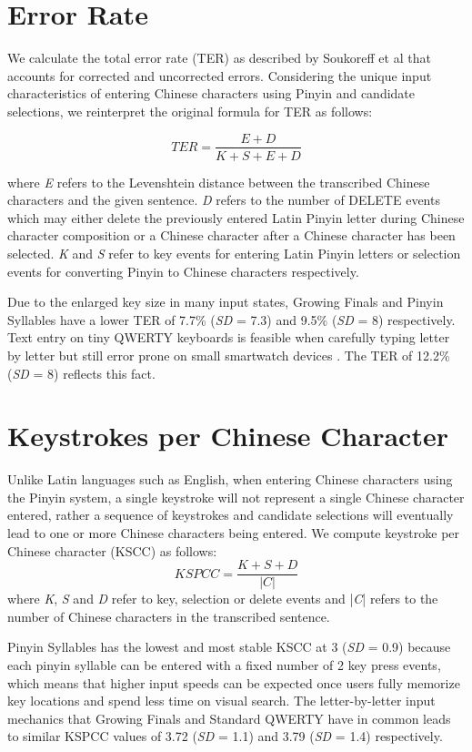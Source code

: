 \section{Error Rate}
We calculate the total error rate (TER) as described by Soukoreff et al \cite{Soukoreff:2003:MTE:642611.642632} that accounts for corrected and uncorrected errors. Considering the unique input characteristics of entering Chinese characters using Pinyin and candidate selections, we reinterpret the original formula for TER as follows:

\[ TER = \frac{E + D}{K + S + E + D} \]

where \textit{E} refers to the Levenshtein distance between the transcribed Chinese characters and the given sentence. \textit{D} refers to the number of DELETE events which may either delete the previously entered Latin Pinyin letter during Chinese character composition or a Chinese character after a Chinese character has been selected. \textit{K} and \textit{S} refer to key events for entering Latin Pinyin letters or selection events for converting Pinyin to Chinese characters respectively.


Due to the enlarged key size in many input states, Growing Finals and Pinyin Syllables have a lower TER of 7.7\% (\textit{SD} = 7.3) and 9.5\% (\textit{SD} = 8) respectively. Text entry on tiny QWERTY keyboards is feasible when carefully typing letter by letter but still error prone on small smartwatch devices \cite{Leiva:2015:TET:2702123.2702388}. The TER of 12.2\% (\textit{SD} = 8) reflects this fact.


\section{Keystrokes per Chinese Character}
Unlike Latin languages such as English, when entering Chinese characters using the Pinyin system, a single keystroke will not represent a single Chinese character entered, rather a sequence of keystrokes and candidate selections will eventually lead to one or more Chinese characters being entered. We compute keystroke per Chinese character (KSCC) as follows:
\[ KSPCC = \frac{K + S + D}{|C|} \]
where \textit{K}, \textit{S} and \textit{D} refer to key, selection or delete events and |\textit{C}| refers to the number of Chinese characters in the transcribed sentence.

Pinyin Syllables has the lowest and most stable KSCC at 3 (\textit{SD} = 0.9) because each pinyin syllable can be entered with a fixed number of 2 key press events, which means that higher input speeds can be expected once users fully memorize key locations and spend less time on visual search. The letter-by-letter input mechanics that Growing Finals and Standard QWERTY have in common leads to similar KSPCC values of 3.72 (\textit{SD} = 1.1) and 3.79 (\textit{SD} = 1.4) respectively.
 
